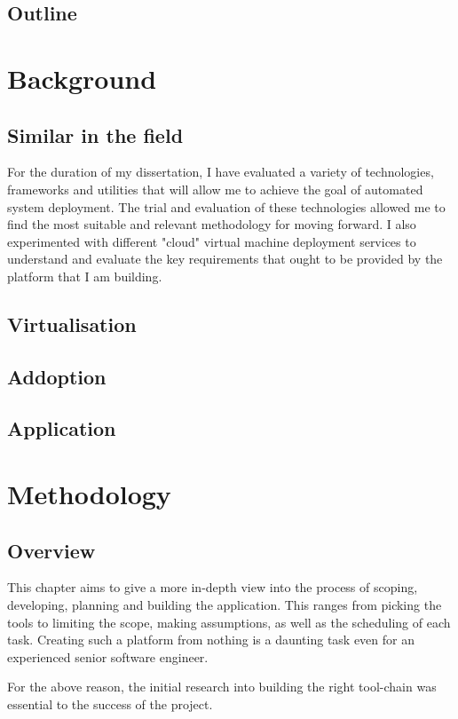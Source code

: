 \documentclass{article}
\begin{document}
  \subsection{Outline}

  \newpage
  \section{Background}
  \subsection{Similar in the field}
	For the duration of my dissertation, I have evaluated a variety of technologies, frameworks and utilities that will allow me to achieve the goal of automated system deployment. The trial and evaluation of these technologies allowed me to find the most suitable and relevant methodology for moving forward. I also experimented with different "cloud" virtual machine deployment services to understand and evaluate the key requirements that ought to be provided by the platform that I am building. 
  \subsection{Virtualisation}
  \subsection{Addoption}
  \subsection{Application}

  \newpage
  \section{Methodology}
  \subsection{Overview}
	This chapter aims to give a more in-depth view into the process of scoping, developing, planning and building the application. This ranges from picking the tools to limiting the scope, making assumptions, as well as the scheduling of each task. Creating such a platform from nothing is a daunting task even for an experienced senior software engineer.
	
	For the above reason, the initial research into building the right tool-chain was essential to the success of the project.
	
\end{document}
